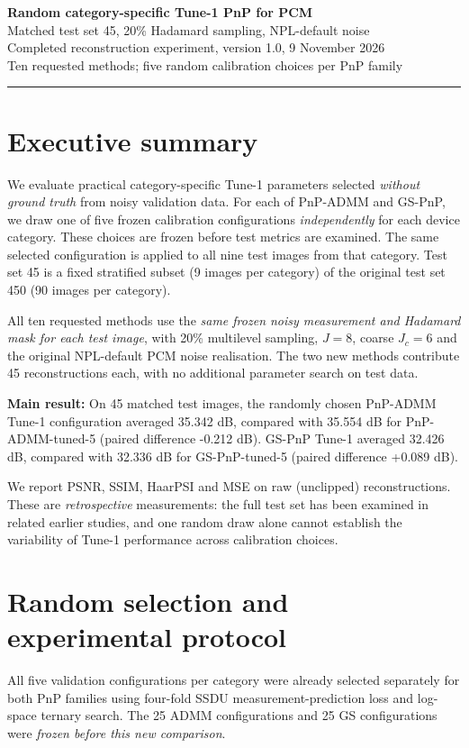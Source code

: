 \documentclass[10pt,a4paper]{article}
\begin{document}
{\LARGE\bfseries Random category-specific Tune-1 PnP for PCM}\\[4pt]
{\large Matched test set 45, 20\% Hadamard sampling, NPL-default noise}\\[5pt]
{\color{gray} Completed reconstruction experiment, version 1.0, 9 November 2026}\\[3pt]
{\color{gray} Ten requested methods; five random calibration choices per PnP family}
\par\medskip\hrule

\section{Executive summary}
We evaluate practical category-specific Tune-1 parameters
selected \emph{without ground truth} from noisy validation data.
For each of PnP-ADMM and GS-PnP, we draw one of five frozen
calibration configurations \emph{independently} for each device
category. These choices are frozen before test metrics are examined.
The same selected configuration is applied to all nine test images
from that category. Test set 45 is a fixed stratified subset
(9 images per category) of the original test set 450
(90 images per category).

All ten requested methods use the \emph{same frozen noisy
measurement and Hadamard mask for each test image},
with 20\% multilevel sampling, $J=8$, coarse $J_c=6$ and
the original NPL-default PCM noise realisation.
The two new methods contribute 45 reconstructions each,
with no additional parameter search on test data.

\textbf{Main result:} On 45 matched test images, the randomly chosen PnP-ADMM Tune-1 configuration averaged 35.342 dB, compared with 35.554 dB for PnP-ADMM-tuned-5 (paired difference -0.212 dB). GS-PnP Tune-1 averaged 32.426 dB, compared with 32.336 dB for GS-PnP-tuned-5 (paired difference +0.089 dB).

We report PSNR, SSIM, HaarPSI and MSE on raw (unclipped)
reconstructions. These are \emph{retrospective} measurements:
the full test set has been examined in related earlier studies,
and one random draw alone cannot establish the variability of
Tune-1 performance across calibration choices.

\section{Random selection and experimental protocol}
All five validation configurations per category were already
selected separately for both PnP families using four-fold
SSDU measurement-prediction loss and log-space ternary search.
The 25 ADMM configurations and 25 GS configurations were
\emph{frozen before this new comparison}.
\end{document}
